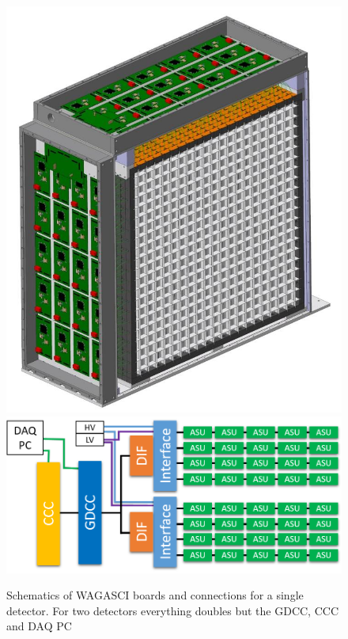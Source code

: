 \begin{figure}[H]
  \centering
  \begin{minipage}{0.48\linewidth}
    \centering
    \includegraphics[width=0.8\linewidth]{WAGASCI-open-view} \\
    \includegraphics[width=0.98\linewidth]{DAQ-overview-WAGASCI}
    \caption{\small Schematics of WAGASCI boards and connections for a single
      detector. For two detectors everything doubles but the GDCC, CCC and DAQ
      PC}\label{fig:DAQ-overview-WAGASCI}
  \end{minipage}%
  \begin{minipage}{0.48\linewidth}
    \centering

\end{minipage}
\end{figure}
